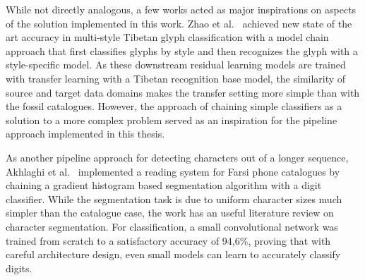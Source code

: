 \documentclass[english,twoside,openright]{UH_DS_MSc}
\begin{document}
While not directly analogous, a few works acted as major inspirations on aspects of the solution implemented in this work.
Zhao et al.~\cite{4zhaoTibetan} achieved new state of the art accuracy in multi-style Tibetan glyph classification
with a model chain approach that first classifies glyphs by style and then recognizes the glyph with a style-specific model. As these downstream
 residual learning models are trained with transfer learning with a Tibetan 
 recognition base model, the similarity of source and target data domains makes the transfer setting more simple than with
the fossil catalogues. However, the approach of 
  chaining simple classifiers as a solution to a more complex problem served as an inspiration for
   the pipeline approach implemented in this thesis.





As another pipeline approach for detecting characters out of a longer sequence, Akhlaghi et al.~\cite{1akhlaghiFarsi} implemented 
a reading system for Farsi phone catalogues by chaining a gradient histogram based segmentation 
algorithm with a digit classifier. While the segmentation task is due to uniform character
 sizes much simpler than the catalogue case, the work has an useful literature review on
  character segmentation. For classification, a small convolutional network was trained
   from scratch to a satisfactory accuracy of 94,6\%, proving that with careful architecture design,
    even small models can learn to accurately classify digits.
\end{document}
